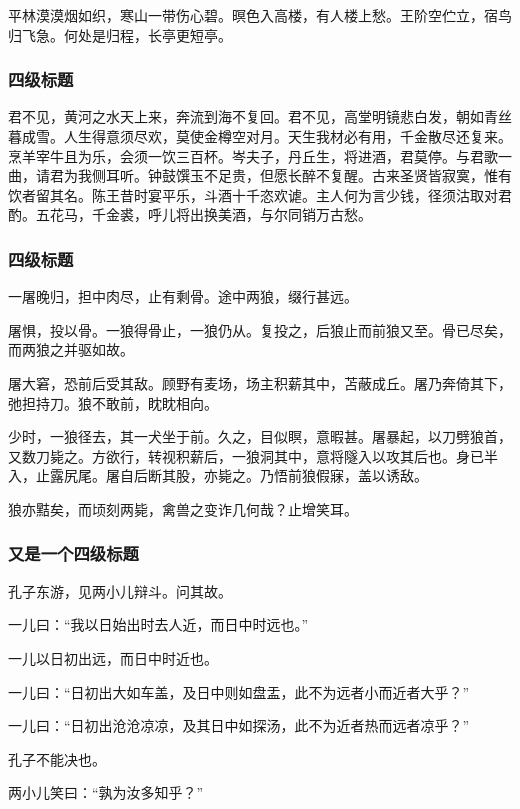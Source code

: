         平林漠漠烟如织，寒山一带伤心碧。暝色入高楼，有人楼上愁。王阶空伫立，宿鸟归飞急。何处是归程，长亭更短亭。


            \subsubsection{四级标题}
                
            君不见，黄河之水天上来，奔流到海不复回。君不见，高堂明镜悲白发，朝如青丝暮成雪。人生得意须尽欢，莫使金樽空对月。天生我材必有用，千金散尽还复来。烹羊宰牛且为乐，会须一饮三百杯。岑夫子，丹丘生，将进酒，君莫停。与君歌一曲，请君为我侧耳听。钟鼓馔玉不足贵，但愿长醉不复醒。古来圣贤皆寂寞，惟有饮者留其名。陈王昔时宴平乐，斗酒十千恣欢谑。主人何为言少钱，径须沽取对君酌。五花马，千金裘，呼儿将出换美酒，与尔同销万古愁。

            \subsubsection{四级标题}

                一屠晚归，担中肉尽，止有剩骨。途中两狼，缀行甚远。

                屠惧，投以骨。一狼得骨止，一狼仍从。复投之，后狼止而前狼又至。骨已尽矣，而两狼之并驱如故。

                屠大窘，恐前后受其敌。顾野有麦场，场主积薪其中，苫蔽成丘。屠乃奔倚其下，弛担持刀。狼不敢前，眈眈相向。

                少时，一狼径去，其一犬坐于前。久之，目似瞑，意暇甚。屠暴起，以刀劈狼首，又数刀毙之。方欲行，转视积薪后，一狼洞其中，意将隧入以攻其后也。身已半入，止露尻尾。屠自后断其股，亦毙之。乃悟前狼假寐，盖以诱敌。

                狼亦黠矣，而顷刻两毙，禽兽之变诈几何哉？止增笑耳。

            \subsubsection{又是一个四级标题}

                孔子东游，见两小儿辩斗。问其故。

                一儿曰：“我以日始出时去人近，而日中时远也。”

                一儿以日初出远，而日中时近也。

                一儿曰：“日初出大如车盖，及日中则如盘盂，此不为远者小而近者大乎？”

                一儿曰：“日初出沧沧凉凉，及其日中如探汤，此不为近者热而远者凉乎？”

                孔子不能决也。

                两小儿笑曰：“孰为汝多知乎？”


